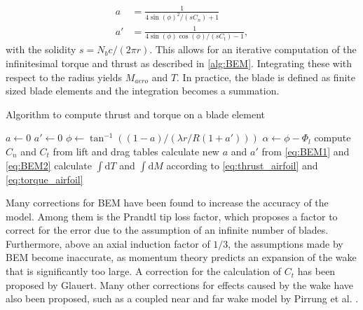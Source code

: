 \begin{align}
a &= \frac{1}{4 \sin(\phi)^2 / \left(s C_n \right) +1} \label{eq:BEM1} \\
a' &= \frac{1}{4 \sin(\phi) \cos(\phi) / \left( s C_t \right) -1}, \label{eq:BEM2}
\end{align}
with the solidity $s = N_b c/(2 \pi r)$. This allows for an iterative computation of the infinitesimal torque and thrust as described in \autoref{alg:BEM}. Integrating these with respect to the radius yields $M_{aero}$ and $T$. In practice, the blade is defined as finite sized blade elements and the integration becomes a summation. \cite[p. 100 - 103]{sorensen_general_2016} \\
\begin{algorithm}
	\caption{Algorithm to compute thrust and torque on a blade element}
	\label{alg:BEM}
	\begin{algorithmic}
			\STATE $a \gets 0$
			\STATE $a'\gets 0$
			\REPEAT
				\STATE $\phi \gets \tan^{-1}((1-a)/(\lambda r/R (1+a') ))$
				\STATE $\alpha \gets \phi - \Phi_l$
				\STATE compute $C_n$ and $C_t$ from lift and drag tables
				\STATE calculate new $a$ and $a'$ from \eqref{eq:BEM1} and \eqref{eq:BEM2}
		\ENDFOR
		\STATE calculate $\int \mathrm{d}T$ and $\int \mathrm{d}M$ according to \eqref{eq:thrust_airfoil} and \eqref{eq:torque_airfoil}
	\end{algorithmic}
\end{algorithm}
Many corrections for BEM have been found to increase the accuracy of the model. Among them is the Prandtl tip loss factor, which proposes a factor to correct for the error due to the assumption of an infinite number of blades. Furthermore, above an axial induction factor of $1/3$, the assumptions made by BEM become inaccurate, as momentum theory predicts an expansion of the wake that is significantly too large. A correction for the calculation of $C_t$ has been proposed by Glauert. Many other corrections for effects caused by the wake have also been proposed, such as a coupled near and far wake model by Pirrung et al. \cite{pirrung_coupled_2016}. \cite[p. 103 - 104]{sorensen_general_2016}
